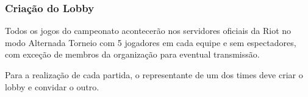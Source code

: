 \subsubsection{Criação do Lobby}

Todos os jogos do campeonato acontecerão nos servidores oficiais da Riot no modo Alternada Torneio com 5 jogadores em cada equipe e sem espectadores, com exceção de membros da organização para eventual transmissão.

Para a realização de cada partida, o representante de um dos times deve criar o lobby e convidar o outro.